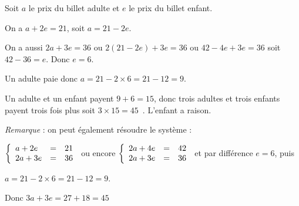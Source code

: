 \documentclass[10pt]{article}
\newcommand{\euro}{\eurologo{}}
\begin{document}
\setlength\parindent{0mm}
\pagestyle{fancy}
\thispagestyle{empty}
    
    
    




\medskip  

%
%
%
%
Soit $a$ le prix du billet adulte et $e$ le prix du billet enfant.

On a $a + 2e = 21$, soit $a = 21 - 2e$.

On a aussi $2a + 3e = 36$ ou $2(21 - 2e) + 3e = 36$ ou $42 - 4e + 3e = 36$ soit $42 - 36 = e$. Donc $e = 6$.

Un adulte paie donc $a = 21 - 2\times 6 = 21 - 12 = 9$.

Un adulte et un enfant payent $9 + 6 = 15$, donc trois adultes et trois enfants payent trois fois plus soit $3 \times 15 = 45$~\euro. L'enfant a raison.

\emph{Remarque} : on peut également résoudre le système :

$\left\{\begin{array}{l c l}
a + 2e&=&21\\
2a + 3e&=&36
\end{array}\right.$ ou encore $\left\{\begin{array}{l c l}
2a + 4e&=&42\\
2a + 3e&=&36
\end{array}\right.$ et par différence $e = 6$, puis 

$a = 21 - 2\times 6 = 21 - 12 = 9$.

Donc $3a + 3e = 27 + 18 = 45$
\end{document}
